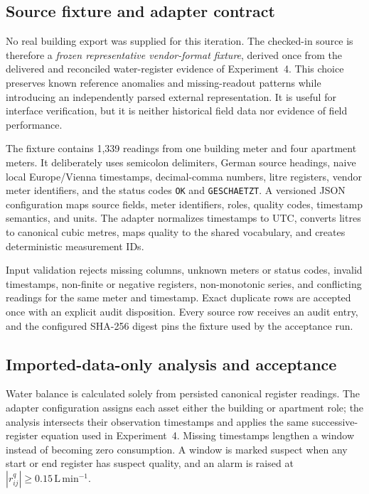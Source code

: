 \documentclass[11pt,a4paper]{article}
\begin{document}
\subsection{Source fixture and adapter contract}
No real building export was supplied for this iteration. The checked-in source
is therefore a \emph{frozen representative vendor-format fixture}, derived once
from the delivered and reconciled water-register evidence of Experiment~4. This
choice preserves known reference anomalies and missing-readout patterns while
introducing an independently parsed external representation. It is useful for
interface verification, but it is neither historical field data nor evidence of
field performance.

The fixture contains 1,339 readings from one building meter and four apartment
meters. It deliberately uses semicolon delimiters, German source headings,
naive local Europe/Vienna timestamps, decimal-comma numbers, litre registers,
vendor meter identifiers, and the status codes \texttt{OK} and
\texttt{GESCHAETZT}. A versioned JSON configuration maps source fields, meter
identifiers, roles, quality codes, timestamp semantics, and units. The adapter
normalizes timestamps to UTC, converts litres to canonical cubic metres, maps
quality to the shared vocabulary, and creates deterministic measurement IDs.

Input validation rejects missing columns, unknown meters or status codes,
invalid timestamps, non-finite or negative registers, non-monotonic series, and
conflicting readings for the same meter and timestamp. Exact duplicate rows are
accepted once with an explicit audit disposition. Every source row receives an
audit entry, and the configured SHA-256 digest pins the fixture used by the
acceptance run.

\subsection{Imported-data-only analysis and acceptance}
Water balance is calculated solely from persisted canonical register readings.
The adapter configuration assigns each asset either the building or apartment
role; the analysis intersects their observation timestamps and applies the same
successive-register equation used in Experiment~4. Missing timestamps lengthen
a window instead of becoming zero consumption. A window is marked suspect when
any start or end register has suspect quality, and an alarm is raised at
$|r^q_{ij}|\geq0.15\,\mathrm{L\,min^{-1}}$.
\end{document}
